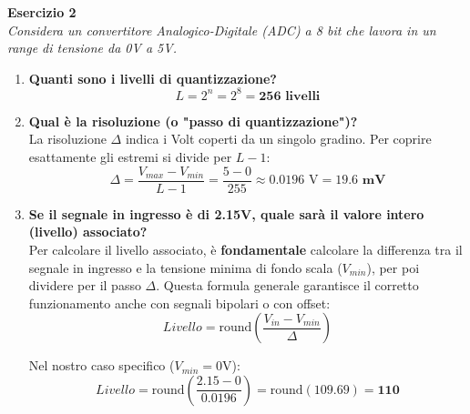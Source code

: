 \vspace{0.5cm}

\textbf{Esercizio 2} \\
\textit{Considera un convertitore Analogico-Digitale (ADC) a 8 bit che lavora in un range di tensione da 0V a 5V.}

\begin{enumerate}
    \item[\textbf{a.}] \textbf{Quanti sono i livelli di quantizzazione?} \\
    $$L = 2^n = 2^8 = \mathbf{256 \text{ livelli}}$$

    \item[\textbf{b.}] \textbf{Qual è la risoluzione (o "passo di quantizzazione")?} \\
    La risoluzione $\Delta$ indica i Volt coperti da un singolo gradino. Per coprire esattamente gli estremi si divide per $L-1$:
    $$\Delta = \frac{V_{max} - V_{min}}{L - 1} = \frac{5 - 0}{255} \approx 0.0196 \text{ V} = \mathbf{19.6 \text{ mV}}$$

    \item[\textbf{c.}] \textbf{Se il segnale in ingresso è di 2.15V, quale sarà il valore intero (livello) associato?} \\
    Per calcolare il livello associato, è \textbf{fondamentale} calcolare la differenza tra il segnale in ingresso e la tensione minima di fondo scala ($V_{min}$), per poi dividere per il passo $\Delta$.
    Questa formula generale garantisce il corretto funzionamento anche con segnali bipolari o con offset:
    $$Livello = \text{round}\left( \frac{V_{in} - V_{min}}{\Delta} \right)$$

    Nel nostro caso specifico ($V_{min} = 0\text{V}$):
    $$Livello = \text{round}\left( \frac{2.15 - 0}{0.0196} \right) = \text{round}(109.69) = \mathbf{110}$$
\end{enumerate}

\vspace{0.5cm}
\noindent
{}


